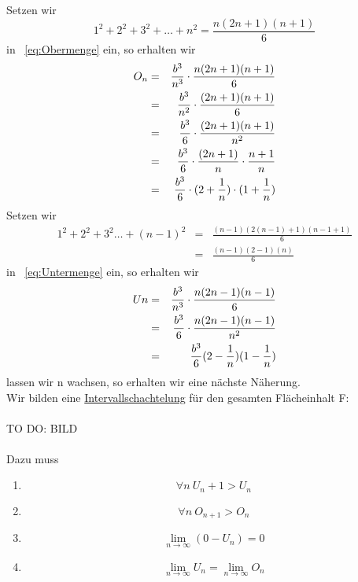 \documentclass{report}
\begin{document}
Setzen wir 
\begin{equation*}1^2+2^2+3^2+\ldots+n^2= \frac{n(2n+1)(n+1)}{6}\end{equation*}
in ~\ref{eq:Obermenge} ein, so erhalten wir
\begin{eqnarray}
	O_n &=& \frac{b^3}{n^3} \cdot \frac{n(2n+1)(n+1)}{6} \notag\\
	&=& \frac{b^3}{n^2} \cdot \frac{(2n+1)(n+1)}{6}\notag\\
	&=&\frac{b^3}{6} \cdot \frac{(2n+1)(n+1)}{n^2}\notag\\
	&=& \frac{b^3}{6}\cdot\frac{(2n+1)}{n}\cdot\frac{n+1}{n}\notag\\
	&=& \frac{b^3}{6}\cdot (2+\frac{1}{n})\cdot(1+\frac{1}{n}) \label{eq:Obermenge2}
\end{eqnarray}
Setzen wir
\begin{eqnarray*}
	1^2+2^2+3^2\ldots+(n-1)^2 &=& \frac{(n-1)(2(n-1)+1)(n-1+1)}{6}\\
	&=& \frac{(n-1)(2-1)(n)}{6}
\end{eqnarray*}
in  ~\ref{eq:Untermenge} ein, so erhalten wir
\begin{eqnarray}
	Un &=& \frac{b^3}{n^3}\cdot\frac{n(2n-1)(n-1)}{6} \notag\\
	&=& \frac{b^3}{6}\cdot \frac{n(2n-1)(n-1)}{n^2} \notag\\
	&=& \frac{b^3}{6}(2-\frac{1}{n})(1-\frac{1}{n}) \label{eq:Untermenge2}
\end{eqnarray}
lassen wir n wachsen, so erhalten wir eine nächste Näherung.\\
Wir bilden eine \underline{Intervallschachtelung} für den gesamten Flächeinhalt F:\\
\\
TO DO: BILD\\
\\
Dazu muss
\begin{enumerate}
	\item
		\begin{equation*}\forall n \> U_n+1 > U_n\end{equation*}
	\item
		\begin{equation*}\forall n\> O_{n+1} > O_n\end{equation*}
	\item
		\begin{equation*}\lim_{n\to \infty}(0-U_n) =0\end{equation*}
	\item
		\begin{equation*}\lim_{n\to \infty} U_n = \lim_{n\to\infty}O_n\end{equation*}
\end{enumerate}
\end{document}
